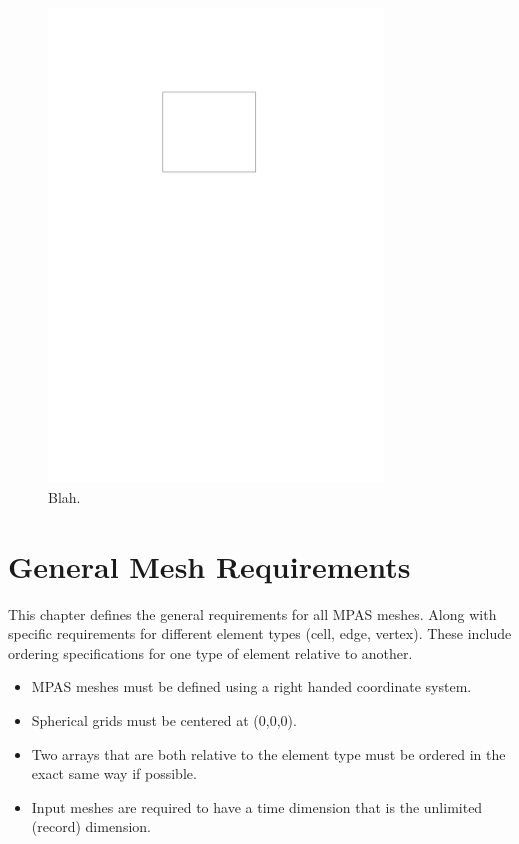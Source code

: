 \documentclass[11pt]{report}
\begin{document}
\begin{figure}[htb]
\begin{center}
\includegraphics[width=3.5in]{figures/blank_figure.pdf}
\caption{Blah.}
\label{fig:planar_spherical}
\end{center}
\end{figure}


\chapter{General Mesh Requirements}

This chapter defines the general requirements for all MPAS meshes. Along with specific requirements for different element types (cell, edge, vertex). These include ordering specifications for one type of element relative to another.

\begin{itemize}
	\item MPAS meshes must be defined using a right handed coordinate system.
	\item Spherical grids must be centered at (0,0,0).
	\item Two arrays that are both relative to the element type must be ordered in the exact same way if possible.
	\item Input meshes are required to have a time dimension that is the unlimited (record) dimension.
\end{itemize}
\end{document}
